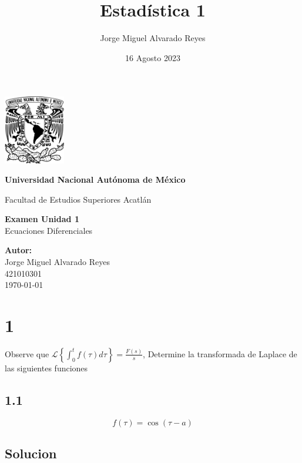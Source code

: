 \documentclass{article}
\title{Estadística 1}
\author{Jorge Miguel Alvarado Reyes}
\date{16 Agosto 2023}
\begin{document}
\begin{titlepage}
    \begin{center}
        \includegraphics[width=0.2\textwidth]{../../unam.png}
        \vspace*{.5cm}

        \LARGE
        \textbf{Universidad Nacional Autónoma de México}

        \vspace{0.5cm}
        \LARGE
        Facultad de Estudios Superiores Acatlán

        \vspace{2cm}

        \textbf{Examen Unidad 1} \\
        Ecuaciones Diferenciales

        \vfill

        \vspace{1cm}

        \textbf{\large Autor:} \\
        Jorge Miguel Alvarado Reyes \\
        421010301\\
        \vspace{.5cm}
        \normalsize \today

    \end{center}
\end{titlepage}
\newpage

\tableofcontents

\newpage
\section{1}
Observe que $\mathcal{L} \left\{ \int_{0}^{t} f(\tau) d\tau \right\} =  \frac{F(s)}{s} $,  Determine la transformada de Laplace de las siguientes funciones


\subsection*{1.1}

\[f(\tau) = \cos(\tau - a)\]

\subsection*{Solucion}
\end{document}
